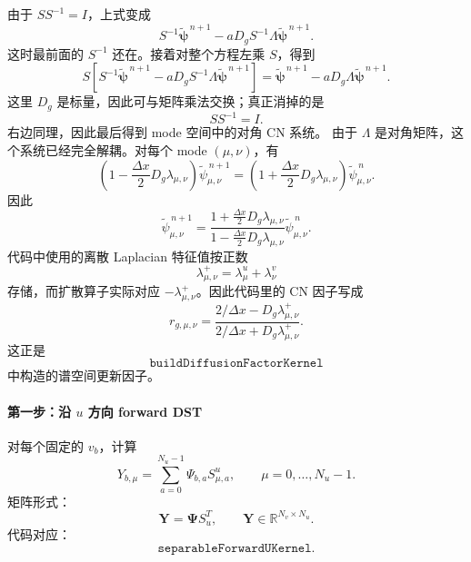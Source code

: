 \documentclass[11pt,a4paper]{ctexart}
\begin{document}
由于 \(SS^{-1}=I\)，上式变成
\begin{equation}
  S^{-1}\widetilde{\boldsymbol\psi}^{\,n+1}
  -
  aD_gS^{-1}\Lambda
  \widetilde{\boldsymbol\psi}^{\,n+1}.
\end{equation}
这时最前面的 \(S^{-1}\) 还在。接着对整个方程左乘 \(S\)，得到
\begin{equation}
  S
  \left[
    S^{-1}\widetilde{\boldsymbol\psi}^{\,n+1}
    -
    aD_gS^{-1}\Lambda
    \widetilde{\boldsymbol\psi}^{\,n+1}
  \right]
  =
  \widetilde{\boldsymbol\psi}^{\,n+1}
  -
  aD_g\Lambda
  \widetilde{\boldsymbol\psi}^{\,n+1}.
\end{equation}
这里 \(D_g\) 是标量，因此可与矩阵乘法交换；真正消掉的是
\begin{equation}
  SS^{-1}=I.
\end{equation}
右边同理，因此最后得到 mode 空间中的对角 CN 系统。
由于 \(\Lambda\) 是对角矩阵，这个系统已经完全解耦。对每个 mode \((\mu,\nu)\)，有
\begin{equation}
  \left(
    1-\frac{\Delta x}{2}D_g\lambda_{\mu,\nu}
  \right)
  \widetilde\psi^{\,n+1}_{\mu,\nu}
  =
  \left(
    1+\frac{\Delta x}{2}D_g\lambda_{\mu,\nu}
  \right)
  \widetilde\psi^{\,n}_{\mu,\nu}.
\end{equation}
因此
\begin{equation}
  \widetilde\psi^{\,n+1}_{\mu,\nu}
  =
  \frac{
    1+\frac{\Delta x}{2}D_g\lambda_{\mu,\nu}
  }{
    1-\frac{\Delta x}{2}D_g\lambda_{\mu,\nu}
  }
  \widetilde\psi^{\,n}_{\mu,\nu}.
\end{equation}
代码中使用的离散 Laplacian 特征值按正数
\begin{equation}
  \lambda^+_{\mu,\nu}
  =
  \lambda^u_\mu+\lambda^v_\nu
\end{equation}
存储，而扩散算子实际对应 \(-\lambda^+_{\mu,\nu}\)。因此代码里的 CN 因子写成
\begin{equation}
  r_{g,\mu,\nu}
  =
  \frac{
    2/\Delta x-D_g\lambda^+_{\mu,\nu}
  }{
    2/\Delta x+D_g\lambda^+_{\mu,\nu}
  }.
\end{equation}
这正是
\begin{equation}
  \texttt{buildDiffusionFactorKernel}
\end{equation}
中构造的谱空间更新因子。

\paragraph{第一步：沿 \(u\) 方向 forward DST}
对每个固定的 \(v_b\)，计算
\begin{equation}
  Y_{b,\mu}
  =
  \sum_{a=0}^{N_u-1}
  \Psi_{b,a} S^u_{\mu,a},
  \qquad
  \mu=0,\ldots,N_u-1.
\end{equation}
矩阵形式：
\begin{equation}
  \mathbf Y
  =
  \mathbf\Psi S_u^T,
  \qquad
  \mathbf Y\in\mathbb R^{N_v\times N_u}.
\end{equation}
代码对应：
\begin{equation}
  \texttt{separableForwardUKernel}.
\end{equation}
\end{document}
